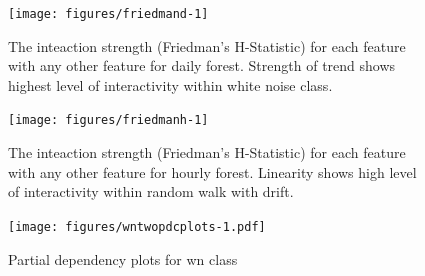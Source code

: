 \documentclass[11pt,a4paper,]{article}
\begin{document}
\begin{figure}[h]

{\centering \texttt{[image: figures/friedmand-1]} 

}

\caption{The inteaction strength (Friedman's H-Statistic) for each feature with any other feature for daily forest. Strength of trend shows highest level of interactivity within white noise class.}\label{fig:friedmand}
\end{figure}

\begin{figure}[h]

{\centering \texttt{[image: figures/friedmanh-1]} 

}

\caption{The inteaction strength (Friedman's H-Statistic) for each feature with any other feature for hourly forest. Linearity shows high level of interactivity within random walk with drift.}\label{fig:friedmanh}
\end{figure}

\begin{figure}
\centering
\texttt{[image: figures/wntwopdcplots-1.pdf]}
\caption{\label{fig:wntwopdcplots}Partial dependency plots for wn class}
\end{figure}

\clearpage

\printbibliography[title=References]
\end{document}
